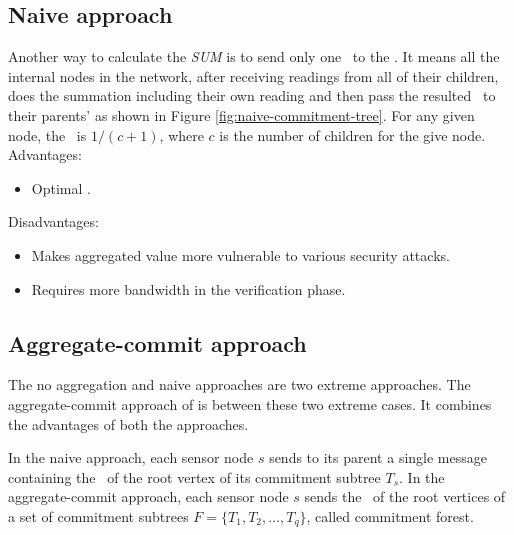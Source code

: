 	\subsection{Naive approach}
		Another way to calculate the \textit{SUM} is to send only one \payload\ to the \bs.
		It means all the internal nodes in the network, after receiving readings from all of their children, does the summation including their own reading and then pass the resulted \payload\ to their parents' as shown in Figure \ref{fig:naive-commitment-tree}.
		For any given node, the \inforate\ is $1 / (c + 1)$, where $c$ is the number of children for the give node.\\
		Advantages:
			\begin{itemize}
				\item Optimal \inforate.
			\end{itemize}
		Disadvantages:
			\begin{itemize}
				\item Makes aggregated value more vulnerable to various security attacks.
				\item Requires more bandwidth in the verification phase.
			\end{itemize}

	\subsection{Aggregate-commit approach}
		The no aggregation and naive approaches are two extreme approaches.
		The aggregate-commit approach of \cite{chan2006secure} is between these two extreme cases. It combines the advantages of both the approaches.

		In the naive approach, each sensor node $s$ sends to its parent a single message containing the \payload\ of the root vertex of its commitment subtree $T_{s}$.
		In the aggregate-commit approach, each sensor node $s$ sends the \payloads\ of the root vertices of a set of commitment subtrees $F = \{ T_{1},T_{2},\dotsc,T_{q} \} $, called commitment forest. 

